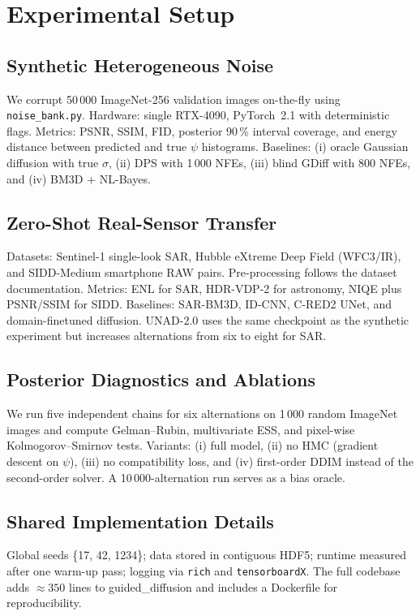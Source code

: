 \documentclass{article} %
\begin{document}
\section{Experimental Setup}
\label{sec:experimental}
\subsection{Synthetic Heterogeneous Noise}
We corrupt 50\,000 ImageNet-256 validation images on-the-fly using \texttt{noise\_bank.py}. Hardware: single RTX-4090, PyTorch~2.1 with deterministic flags. Metrics: PSNR, SSIM, FID, posterior 90\,\% interval coverage, and energy distance between predicted and true \(\psi\) histograms. Baselines: (i) oracle Gaussian diffusion with true \(\sigma\), (ii) DPS with 1\,000 NFEs, (iii) blind GDiff with 800 NFEs, and (iv) BM3D + NL-Bayes.

\subsection{Zero-Shot Real-Sensor Transfer}
Datasets: Sentinel-1 single-look SAR, Hubble eXtreme Deep Field (WFC3/IR), and SIDD-Medium smartphone RAW pairs. Pre-processing follows the dataset documentation. Metrics: ENL for SAR, HDR-VDP-2 for astronomy, NIQE plus PSNR/SSIM for SIDD. Baselines: SAR-BM3D, ID-CNN, C-RED2 UNet, and domain-finetuned diffusion. UNAD-2.0 uses the same checkpoint as the synthetic experiment but increases alternations from six to eight for SAR.

\subsection{Posterior Diagnostics and Ablations}
We run five independent chains for six alternations on 1\,000 random ImageNet images and compute Gelman–Rubin, multivariate ESS, and pixel-wise Kolmogorov–Smirnov tests. Variants: (i) full model, (ii) no HMC (gradient descent on \(\psi\)), (iii) no compatibility loss, and (iv) first-order DDIM instead of the second-order solver. A 10\,000-alternation run serves as a bias oracle.

\subsection{Shared Implementation Details}
Global seeds \{17, 42, 1234\}; data stored in contiguous HDF5; runtime measured after one warm-up pass; logging via \texttt{rich} and \texttt{tensorboardX}. The full codebase adds \(\approx\!350\) lines to guided\_diffusion and includes a Dockerfile for reproducibility.
\end{document}

